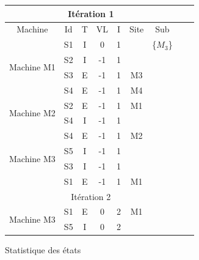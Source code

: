 \begin{tableth}
	\centering
	\begin{tabular}{|c|c|c|c|c|c|c|c|c|}
		\hline
		\multicolumn{7}{|c|}{Itération 1}                                  \\ \hline
		          Machine           & Id & T & VL & I & Site &    Sub      \\ \hline
		\multirow{4}{*}{Machine M1} & S1 & I & 0  & 1 &      & \{$M_3$\}   \\ \cline{2-7}
		                            & S2 & I & -1 & 1 &      &             \\ \cline{2-7}
		                            & S3 & E & -1 & 1 &  M3  &             \\ \cline{2-7}
		                            & S4 & E & -1 & 1 &  M4  &             \\ \hline
		\multirow{2}{*}{Machine M2} & S2 & E & -1 & 1 &  M1  &             \\ \cline{2-7}
		                            & S4 & I & -1 & 1 &      &             \\ \hline
		\multirow{4}{*}{Machine M3} & S4 & E & -1 & 1 &  M2  &             \\ \cline{2-7}
		                            & S5 & I & -1 & 1 &      &             \\ \cline{2-7}
		                            & S3 & I & -1 & 1 &      &             \\ \cline{2-7}
		                            & S1 & E & -1 & 1 &  M1  &             \\ \hline
		\multicolumn{7}{|c|}{Itération 2}                                  \\ \hline
		\multirow{2}{*}{Machine M3} & S1 & E & 0  & 2 &  M1  &             \\ \cline{2-7}
		                            & S5 & I & 0  & 2 &      &             \\ \hline
	\end{tabular}
	\caption{Statistique des \'{e}tats}\label{statistique}
\end{tableth}

